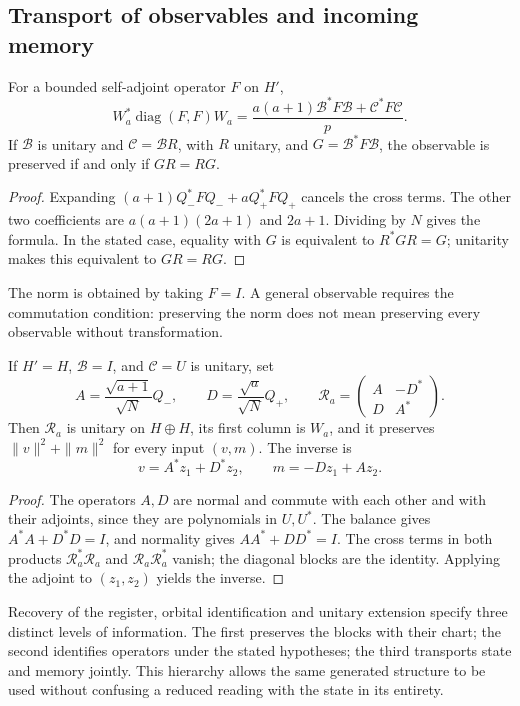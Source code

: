 \subsection{Transport of observables and incoming memory}
\label{v:subsec:acoplamiento-lectores}

\begin{theorem}
\label{v:thm:acoplamiento-lector}
For a bounded self-adjoint operator \(F\) on \(H'\),
\[
 W_a^*\operatorname{diag}(F,F)W_a
 =\frac{a(a+1)\mathcal B^*F\mathcal B+\mathcal C^*F\mathcal C}{p}.
\]
If \(\mathcal B\) is unitary and \(\mathcal C=\mathcal BR\), with
\(R\) unitary, and \(G=\mathcal B^*F\mathcal B\), the observable is
preserved if and only if \(GR=RG\).
\end{theorem}
\begin{proof}
Expanding \((a+1)Q_-^*FQ_-+aQ_+^*FQ_+\) cancels the cross terms.
The other two coefficients are
\(a(a+1)(2a+1)\) and \(2a+1\). Dividing by \(N\) gives the formula.
In the stated case, equality with \(G\) is equivalent to \(R^*GR=G\);
unitarity makes this equivalent to \(GR=RG\).
\end{proof}

The norm is obtained by taking \(F=I\). A general observable requires
the commutation condition: preserving the norm does not mean preserving
every observable without transformation.

\begin{theorem}
\label{v:thm:acoplamiento-memoria}
If \(H'=H\), \(\mathcal B=I\), and \(\mathcal C=U\) is unitary, set
\[
 A=\frac{\sqrt{a+1}}{\sqrt N}Q_-,\qquad
 D=\frac{\sqrt a}{\sqrt N}Q_+,\qquad
 \mathscr R_a=\begin{pmatrix}A&-D^*\\D&A^*\end{pmatrix}.
\]
Then \(\mathscr R_a\) is unitary on \(H\oplus H\), its first
column is \(W_a\), and it preserves \(\|v\|^2+\|m\|^2\) for every
input \((v,m)\). The inverse is
\[
 v=A^*z_1+D^*z_2,\qquad m=-Dz_1+Az_2.
\]
\end{theorem}
\begin{proof}
The operators \(A,D\) are normal and commute with each other and with their
adjoints, since they are polynomials in \(U,U^*\). The balance gives
\(A^*A+D^*D=I\), and normality gives \(AA^*+DD^*=I\).
The cross terms in both products
\(\mathscr R_a^*\mathscr R_a\) and \(\mathscr R_a\mathscr R_a^*\)
vanish; the diagonal blocks are the identity. Applying the adjoint to
\((z_1,z_2)\) yields the inverse.
\end{proof}

Recovery of the register, orbital identification and unitary
extension specify three distinct levels of information. The first
preserves the blocks with their chart; the second identifies operators under
the stated hypotheses; the third transports state and memory
jointly. This hierarchy allows the same generated structure to be used without
confusing a reduced reading with the state in its entirety.
